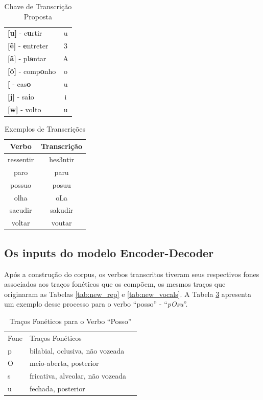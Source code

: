 \begin{table}[H]
\begin{center}
\begin{tabular}{lc}
\textbf{{[}u{]}} - c\textbf{u}rtir & u \\
\textbf{{[}\~e{]}} - \textbf{e}ntreter & 3 \\
\textbf{{[}ã{]}} - pl\textbf{a}ntar & A \\
\textbf{{[}\~o{]}} - comp\textbf{o}nho & o \\
\textbf{{[}\textupsilon{]}} - cas\textbf{o} & u \\
\textbf{{[}j{]}} - sa\textbf{i}o & i \\
\textbf{{[}w{]}} - vo\textbf{l}to & u
\end{tabular}
\end{center}
\caption{Chave de Transcrição Proposta}
\label{tab:chave}
\end{table}

\begin{table}[H]
\begin{center}
\begin{tabular}{cc}
\hline
\textbf{Verbo} & \textbf{Transcrição} \\ \hline
ressentir & hes3ntir \\
paro & paru \\
possuo & posuu \\
olha & oLa \\
sacudir & sakudir \\
voltar & voutar \\ \hline
\end{tabular}
\end{center}
\caption{Exemplos de Transcrições}
\label{tab:transc}
\end{table}






\subsection{Os inputs do modelo Encoder-Decoder}
\label{sec:inputs}

Após a construção do corpus, os verbos transcritos tiveram seus respectivos fones associados aos traços fonéticos que os compõem, os mesmos traços que originaram as Tabelas \ref{tab:new_rep} e \ref{tab:new_vocals}. A Tabela \ref{tab:pOsu} apresenta um exemplo desse processo para o verbo “posso” - “\textit{pOsu}”. 

\begin{table}[H]
\begin{center}
\begin{tabular}{lll}
Fone & Traços Fonéticos &  \\ \cline{1-2}
p & bilabial, oclusiva, não vozeada &  \\
O & meio-aberta, posterior &  \\
s & fricativa, alveolar, não vozeada &  \\
u & fechada, posterior & 
\end{tabular}
\end{center}
\caption{Traços Fonéticos para o Verbo “Posso”}
\label{tab:pOsu}
\end{table}


